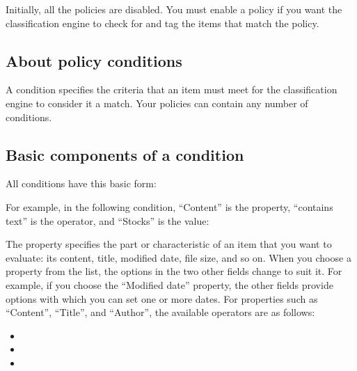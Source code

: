 \documentclass[letterpaper,10pt,english]{sphinxmanual}
\begin{document}
\begin{figure}[htbp]
\centering

\noindent{}
\end{figure}

Initially, all the policies are disabled. You must enable a policy if you want the classification engine to check for and tag the items that match the policy.


\subsection{About policy conditions}
\label{\detokenize{mcdmp_app_ug:about-policy-conditions}}
A condition specifies the criteria that an item must meet for the classification engine to consider it a match. Your policies can contain any number of conditions.


\subsection{Basic components of a condition}
\label{\detokenize{mcdmp_app_ug:basic-components-of-a-condition}}
All conditions have this basic form:


For example, in the following condition, “Content” is the property, “contains text” is
the operator, and “Stocks” is the value:

\begin{figure}[htbp]
\centering

\noindent{}
\end{figure}

The property specifies the part or characteristic of an item that you want to evaluate:
its content, title, modified date, file size, and so on. When you choose a property
from the list, the options in the two other fields change to suit it. For example, if you
choose the “Modified date” property, the other fields provide options with which you
can set one or more dates. For properties such as “Content”, “Title”, and “Author”,
the available operators are as follows:
\begin{itemize}
\item {} 

\item {} 

\item {} 

\end{itemize}
\end{document}
